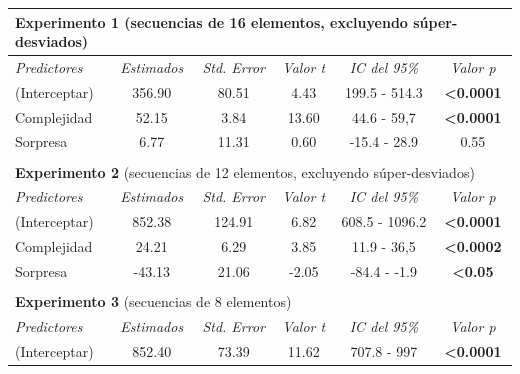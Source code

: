 \begin{table}[]
\centering
\begin{tabular}{lccccc}
\multicolumn{6}{l}{\textbf{Experimento 1} (secuencias de 16 elementos, excluyendo súper-desviados)}                          \\ \hline
\textit{Predictores}     & \textit{Estimados}  & \textit{Std. Error} & \textit{Valor t}   & \textit{IC del 95\%} & \textit{Valor p}       \\ \hline
(Interceptar)         & 356.90        & 80.51        & 4.43         & 199.5 - 514.3    & \textbf{\textless{}0.0001} \\
Complejidad          & 52.15        & 3.84         & 13.60        & 44.6 - 59,7     & \textbf{\textless{}0.0001} \\
Sorpresa           & 6.77         & 11.31        & 0.60         & -15.4 - 28.9     &0.55            \\ \hline
\multicolumn{1}{c}{}     & \multicolumn{1}{l}{} &           &           &           &              \\
\multicolumn{6}{l}{\textbf{Experimento 2} (secuencias de 12 elementos, excluyendo súper-desviados)}                          \\ \hline
\textit{Predictores}     & \textit{Estimados}  & \textit{Std. Error} & \textit{Valor t}   & \textit{IC del 95\%} & \textit{Valor p}       \\ \hline
(Interceptar)         & 852.38        & 124.91        & 6.82         & 608.5 - 1096.2    & \textbf{\textless{}0.0001} \\
Complejidad          & 24.21        & 6.29         & 3.85         & 11.9 - 36,5     & \textbf{\textless{}0.0002} \\
Sorpresa           & -43.13        & 21.06        & -2.05        & -84.4 - -1.9     & \textbf{\textless{}0.05}  \\ \hline
\textbf{}           & \multicolumn{1}{l}{} & \multicolumn{1}{l}{} & \multicolumn{1}{l}{} & \multicolumn{1}{l}{} & \multicolumn{1}{l}{}   \\
\multicolumn{6}{l}{\textbf{Experimento 3} (secuencias de 8 elementos)}                                        \\ \hline
\textit{Predictores}     & \textit{Estimados}  & \textit{Std. Error} & \textit{Valor t}   & \textit{IC del 95\%} & \textit{Valor p}       \\ \hline
(Interceptar)         & 852.40        & 73.39        & 11.62        & 707.8 - 997     & \textbf{\textless{}0.0001} \\

\end{tabular}
\end{table}
